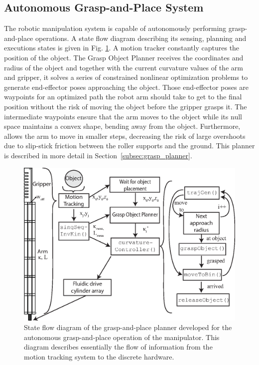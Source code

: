 \subsection{Autonomous Grasp-and-Place System}
\label{subsec:grasp-place-planner}
The robotic manipulation system is capable of autonomously performing grasp-and-place operations. 
A state flow diagram describing its sensing, planning and executions states is given in Fig. \ref{fig:grasp-and-place-planner}. 
A motion tracker constantly captures the position of the object.
The Grasp Object Planner receives the coordinates and radius of the object and together with the current curvature values of the arm and gripper, it solves a series of constrained nonlinear optimization problems to generate end-effector poses approaching the object.
Those end-effector poses are waypoints for an optimized path the robot arm should take to get to the final position without the risk of moving the object before the gripper grasps it. 
The intermediate waypoints ensure that the arm moves to the object while its null space maintains a convex shape,  bending away from the object. 
Furthermore,  allows the arm to move in smaller steps, decreasing the risk of large overshoots due to slip-stick friction between the roller supports and the ground.
This planner is described in more detail in Section~\ref{subsec:grasp_planner}.

\begin{figure}[!htb]
\centering
   \includegraphics[width=0.95\columnwidth]{Figures/processing_control/grasp_place_planner.eps}
   \caption{State flow diagram of the grasp-and-place planner developed for the autonomous grasp-and-place operation of the manipulator. This diagram describes essentially the flow of information from the motion tracking system to the discrete hardware.}
   \label{fig:grasp-and-place-planner}
\end{figure}

